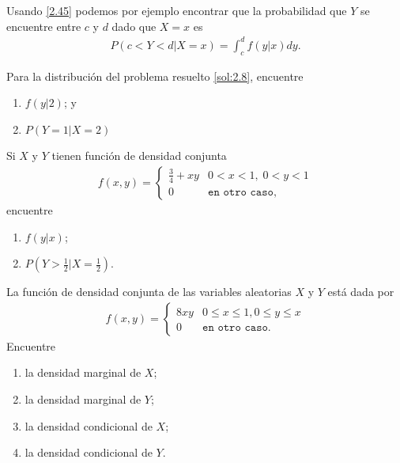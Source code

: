  Usando \eqref{2.45} podemos por ejemplo encontrar que la probabilidad que $Y$  se encuentre entre $c$ y $d$ dado que $X=x$ es
 \begin{align}
  \label{2.46}P(c<Y<d|X=x)=
  \int_{c}^{d}f(y|x)dy.
 \end{align}




 \begin{ejemplo}
  \label{sol:2.27}
  Para la distribución del problema resuelto \ref{sol:2.8}, encuentre
  \begin{enumerate}
   \item $f(y|2)$; y  
   \item $P(Y=1|X=2)$
  \end{enumerate}

 \end{ejemplo}



\begin{ejemplo}
 \label{sol:2.28}
  Si $X$ y $Y$ tienen función de densidad conjunta
 \begin{align}
  f(x,y)=
  \begin{cases}
   \frac{3}{4}+xy & 0<x<1, \; 0<y<1 \\
   0 & \texttt{en otro caso},
  \end{cases}
 \end{align}
encuentre
\begin{enumerate}
 \item $f(y|x)$; 
 \item $P(Y>\frac{1}{2}| X = \frac{1}{2} )$.
\end{enumerate}

\end{ejemplo}



 \begin{ejemplo}
  \label{sol:2.29}
  La función de densidad conjunta de las variables aleatorias $X$ y $Y$ está dada por
  \begin{align}
   f(x,y)=
   \begin{cases}
    8xy & 0\leq x \leq 1, 0\leq y \leq x \\
    0 & \texttt{en otro caso}.
   \end{cases}
  \end{align}
Encuentre
\begin{enumerate}
 \item la densidad marginal de $X$; 
 \item la densidad marginal de $Y$; 
 \item la densidad condicional de $X$; 
 \item la densidad condicional de $Y$.
\end{enumerate}

 \end{ejemplo}




